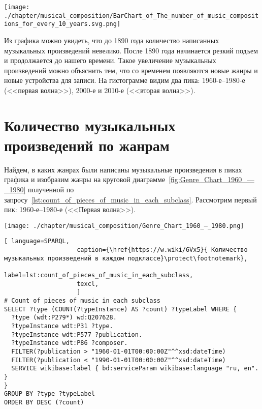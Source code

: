 \newpage
\begin{marginfigure}[0\baselineskip]
	\texttt{[image: ./chapter/musical\_composition/BarChart\_of\_The\_number\_of\_music\_compositions\_for\_every\_10\_years.svg.png]}
	\caption[Гистограмма количества музыкальных композиций за каждые 10 лет с XIX века до настоящего времени]{Гистограмма количества музыкальных композиций за каждые 10 лет с XIX века до настоящего времени}%
	\label{fig:diagram_10_years}%
\end{marginfigure}
Из графика можно увидеть, что до 1890 года количество написанных музыкальных произведений невелико. После 1890 года начинается резкий подъем и продолжается до нашего времени. Такое увеличение музыкальных произведений можно объяснить тем, что со временем появляются новые жанры и новые устройства для записи. На гистограмме видим два пика: 1960-е--1980-е (<<первая волна>>), 2000-е и 2010-е (<<вторая волна>>).


\newpage
\section{Количество музыкальных произведений по жанрам}
Найдем, в каких жанрах были написаны музыкальные произведения в пиках графика и изобразим жанры на круговой диаграмме~\ref{fig:Genre_Chart_1960_—_1980} полученной по запросу~\ref{lst:count_of_pieces_of_music_in_each_subclass}. Рассмотрим первый пик: 1960-е--1980-е (<<Первая волна>>).
\begin{marginfigure}[0\baselineskip]
	\texttt{[image: ./chapter/musical\_composition/Genre\_Chart\_1960\_—\_1980.png]}
	\caption[Круговая диаграмма музыкальных жанров за 1960--1980 годы во всем мире]{Круговая диаграмма музыкальных жанров за 1960--1980 годы во всем мире. Ссылка на SPARQL-запрос: \href{https://w.wiki/6Vx5}{https://w.wiki/6Vx5}.}%
	\label{fig:Genre_Chart_1960_—_1980}%
\end{marginfigure}
\begin{lstlisting}[ language=SPARQL,
                    caption={\href{https://w.wiki/6Vx5}{ Количество музыкальных произведений в каждом подклассе}\protect\footnotemark},
                    label=lst:count_of_pieces_of_music_in_each_subclass,
                    texcl,
                    ]
# Count of pieces of music in each subclass
SELECT ?type (COUNT(?typeInstance) AS ?count) ?typeLabel WHERE {
  ?type (wdt:P279*) wd:Q207628.
  ?typeInstance wdt:P31 ?type.
  ?typeInstance wdt:P577 ?publication.
  ?typeInstance wdt:P86 ?composer.
  FILTER(?publication > "1960-01-01T00:00:00Z"^^xsd:dateTime)        
  FILTER(?publication < "1990-01-01T00:00:00Z"^^xsd:dateTime)
  SERVICE wikibase:label { bd:serviceParam wikibase:language "ru, en". }
}
GROUP BY ?type ?typeLabel
ORDER BY DESC (?count)
\end{lstlisting}%

